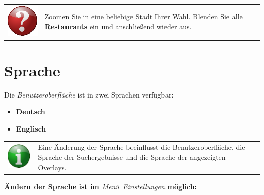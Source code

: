 \documentclass[10pt]{scrreprt}
\newcommand{\textref}[1]{\mbox{\raisebox{0.1ex}{\small$\rightarrow$ }\textit{#1}}}
\begin{document}
\vspace{5mm}
\begin{tabular}{>{\centering \arraybackslash}m{1cm} m{14cm}}
\includegraphics[scale=0.5]{images/quest.eps} & Zoomen Sie in eine beliebige Stadt Ihrer Wahl. Blenden Sie alle \underline{\textbf{Restaurants}} ein und anschließend wieder aus.
\end{tabular}



\newpage
\section{Sprache}  
Die \textref{Benutzeroberfläche} ist in zwei Sprachen verfügbar:
\begin{itemize}
\item \textbf{Deutsch}
\item \textbf{Englisch}
\end{itemize}

\vspace{3mm}
\begin{tabular}{>{\centering \arraybackslash}m{1cm} m{14cm}} \index{Overlays}
\includegraphics[scale=0.5]{images/info.eps} & Eine Änderung der Sprache beeinflusst die Benutzeroberfläche, die Sprache der Suchergebnisse und die Sprache der angezeigten Overlays.
\end{tabular}

\vspace{5mm}
\textbf{Ändern der Sprache ist im} \textref{Menü Einstellungen} \textbf{möglich:}  
\end{document}
